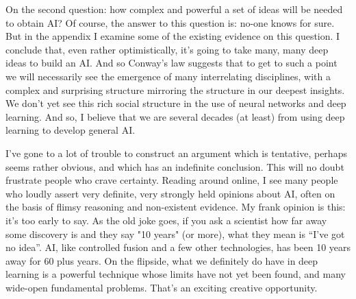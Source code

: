 \documentclass[a4paper,twoside,10pt]{book}
\begin{document}
On the second question: how complex and powerful a set of ideas will be needed to obtain AI? Of course, the answer to this question is: no-one knows for sure. But in the appendix I examine some of the existing evidence on this question. I conclude that, even rather optimistically, it's going to take many, many deep ideas to build an AI. And so Conway's law suggests that to get to such a point we will necessarily see the emergence of many interrelating disciplines, with a complex and surprising structure mirroring the structure in our deepest insights. We don't yet see this rich social structure in the use of neural networks and deep learning. And so, I believe that we are several decades (at least) from using deep learning to develop general AI.

I've gone to a lot of trouble to construct an argument which is tentative, perhaps seems rather obvious, and which has an indefinite conclusion. This will no doubt frustrate people who crave certainty. Reading around online, I see many people who loudly assert very definite, very strongly held opinions about AI, often on the basis of flimsy reasoning and non-existent evidence. My frank opinion is this: it's too early to say. As the old joke goes, if you ask a scientist how far away some discovery is and they say "10 years" (or more), what they mean is ``I've got no idea''. AI, like controlled fusion and a few other technologies, has been 10 years away for 60 plus years. On the flipside, what we definitely do have in deep learning is a powerful technique whose limits have not yet been found, and many wide-open fundamental problems. That's an exciting creative opportunity.
\end{document}

